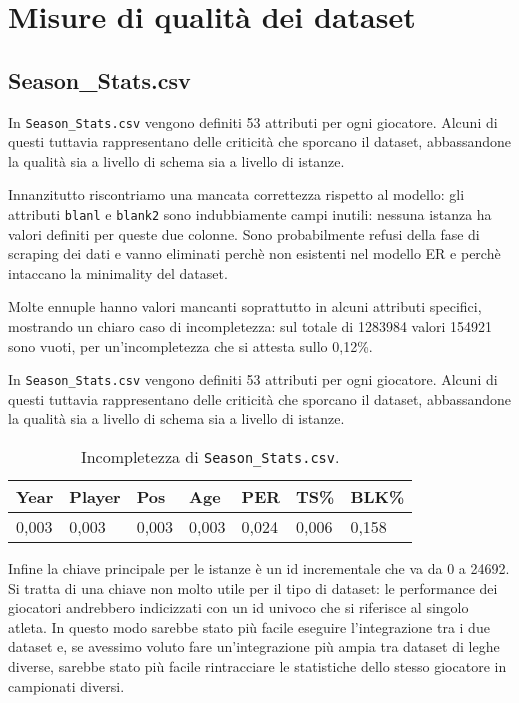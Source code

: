 \section{Misure di qualità dei dataset}

\subsection{Season\_Stats.csv}
In \texttt{Season\_Stats.csv} vengono definiti 53 attributi per ogni giocatore. Alcuni di questi tuttavia rappresentano delle criticità che sporcano il dataset, abbassandone la qualità sia a livello di schema sia a livello di istanze.
\par
Innanzitutto riscontriamo una mancata correttezza rispetto al modello: gli attributi \texttt{blanl} e \texttt{blank2} sono indubbiamente campi inutili: nessuna istanza ha valori definiti per queste due colonne. Sono probabilmente refusi della fase di scraping dei dati e vanno eliminati perchè non esistenti nel modello ER e perchè intaccano la minimality del dataset.
\par
Molte ennuple hanno valori mancanti soprattutto in alcuni attributi specifici, mostrando un chiaro caso di incompletezza: sul totale di 1283984 valori 154921 sono vuoti, per un’incompletezza che si attesta sullo 0,12\%.

In \texttt{Season\_Stats.csv} vengono definiti 53 attributi per ogni giocatore. Alcuni di questi tuttavia rappresentano delle criticità che sporcano il dataset, abbassandone la qualità sia a livello di schema sia a livello di istanze.

\begin{center}
	\begin{longtable}[m]{|m{3em} m{3em} m{3em} m{3em} m{3em} m{3em} m{3em}|} 

		\caption{Incompletezza di \texttt{Season\_Stats.csv}.\label{long}}\\
		\hline
		\bfseries{Year} & \bfseries{Player} & \bfseries{Pos} & \bfseries{Age} & \bfseries{PER} & \bfseries{TS\%} & \bfseries{BLK\%} \\ 
		\hline
		0,003 & 0,003 & 0,003 & 0,003 & 0,024 & 0,006 & 0,158 \\
		\hline
	\end{longtable}
\end{center}

Infine la chiave principale per le istanze è un id incrementale che va da 0 a 24692. Si tratta di una chiave non molto utile per il tipo di dataset: le performance dei giocatori andrebbero indicizzati con un id univoco che si riferisce al singolo atleta. In questo modo sarebbe stato più facile eseguire l’integrazione tra i due dataset e, se avessimo voluto fare un’integrazione più ampia tra dataset di leghe diverse, sarebbe stato più facile rintracciare le statistiche dello stesso giocatore in campionati diversi.

